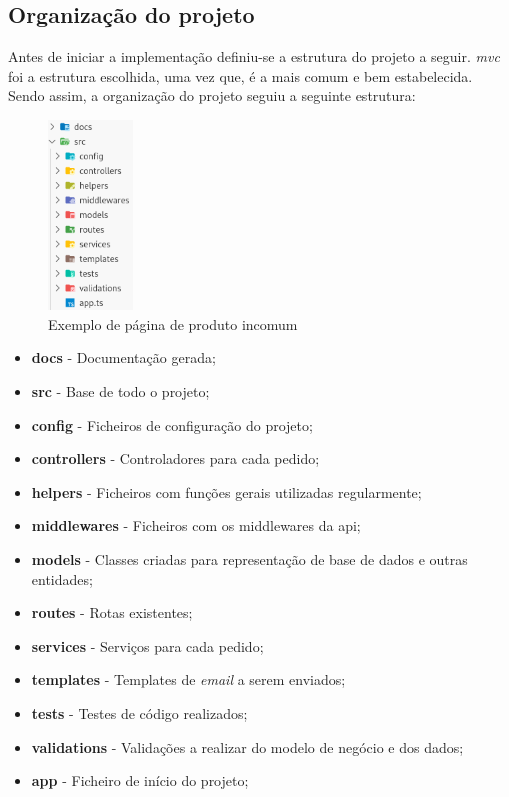 \subsection{Organização do projeto}
Antes de iniciar a implementação definiu-se a estrutura do projeto a seguir. \textit{\acrshort{mvc}} foi a estrutura escolhida, uma vez que, é a mais comum e bem estabelecida. Sendo assim, a organização do projeto seguiu a seguinte estrutura:
\begin{figure}[htb]
 \centering
 \includegraphics[width=0.2\textwidth]{images/implementacao/api/project_organization.png}
 \caption{Exemplo de página de produto incomum}
 \label{fig:63}
\end{figure}

\begin{itemize}
 \item \textbf{docs} - Documentação gerada;
 \item \textbf{src} - Base de todo o projeto;
 \item \textbf{config} - Ficheiros de configuração do projeto;
 \item \textbf{controllers} - Controladores para cada pedido;
 \item \textbf{helpers} - Ficheiros com funções gerais utilizadas regularmente;
 \item \textbf{middlewares} - Ficheiros com os middlewares da api;
 \item \textbf{models} - Classes criadas para representação de base de dados e outras entidades;
 \item \textbf{routes} - Rotas existentes;
 \item \textbf{services} - Serviços para cada pedido;
 \item \textbf{templates} - Templates de \textit{email} a serem enviados;
 \item \textbf{tests} - Testes de código realizados;
 \item \textbf{validations} - Validações a realizar do modelo de negócio e dos dados;
 \item \textbf{app} - Ficheiro de início do projeto;
\end{itemize}